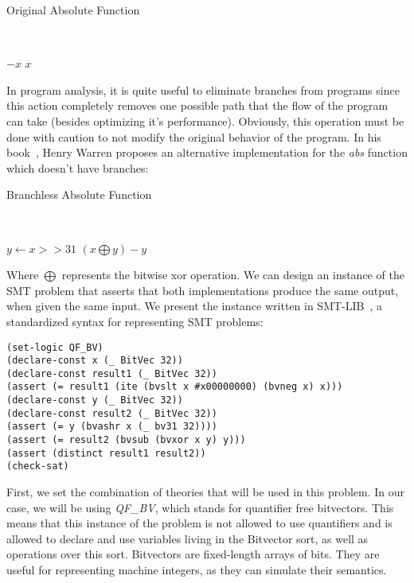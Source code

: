 \begin{algorithm}
\caption{Original Absolute Function}~\label{originalAbs}
\begin{algorithmic}
  \State\Return$-x$
\Else
  \State\Return$x$
\EndIf
\EndFunction
\end{algorithmic}
\end{algorithm}

In program analysis, it is quite useful to eliminate branches from programs since this action completely removes one possible path that the flow of the program can take (besides optimizing it's performance). Obviously, this operation must be done with caution to not modify the original behavior of the program. In his book~\cite{hacker_delight}, Henry Warren proposes an alternative implementation for the \textit{abs} function which doesn't have branches:

\begin{algorithm}
\caption{Branchless Absolute Function}~\label{branchlessAbs}
\begin{algorithmic}
  \State $y \gets x >> 31$
  \State \Return $(x \bigoplus y) - y$
\EndFunction
\end{algorithmic}
\end{algorithm}

Where $\bigoplus$ represents the bitwise xor operation. We can design an instance of the SMT problem that asserts that both implementations produce the same output, when given the same input. We present the instance written in SMT-LIB~\cite{smtlib}, a standardized syntax for representing SMT problems:

\begin{verbatim}
(set-logic QF_BV)
(declare-const x (_ BitVec 32))
(declare-const result1 (_ BitVec 32))
(assert (= result1 (ite (bvslt x #x00000000) (bvneg x) x)))
(declare-const y (_ BitVec 32))
(declare-const result2 (_ BitVec 32))
(assert (= y (bvashr x (_ bv31 32))))
(assert (= result2 (bvsub (bvxor x y) y)))
(assert (distinct result1 result2))
(check-sat)
\end{verbatim}

First, we set the combination of theories that will be used in this problem. In our case, we will be using \textit{QF\_BV}, which stands for quantifier free bitvectors. This means that this instance of the problem is not allowed to use quantifiers and is allowed to declare and use variables living in the Bitvector sort, as well as operations over this sort. Bitvectors are fixed-length arrays of bits. They are useful for representing machine integers, as they can simulate their semantics.

